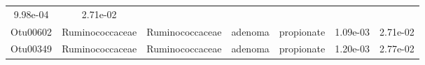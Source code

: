 \documentclass[11pt,]{article}
\begin{document}
\begin{longtable}[]{@{}ccccccc@{}}
\begin{minipage}[t]{0.09\columnwidth}
9.98e-04\strut
\end{minipage} & \begin{minipage}[t]{0.09\columnwidth}\centering\strut
2.71e-02\strut
\end{minipage}\tabularnewline
\begin{minipage}[t]{0.09\columnwidth}\centering\strut
Otu00602\strut
\end{minipage} & \begin{minipage}[t]{0.17\columnwidth}\centering\strut
Ruminococcaceae\strut
\end{minipage} & \begin{minipage}[t]{0.17\columnwidth}\centering\strut
Ruminococcaceae\strut
\end{minipage} & \begin{minipage}[t]{0.09\columnwidth}\centering\strut
adenoma\strut
\end{minipage} & \begin{minipage}[t]{0.11\columnwidth}\centering\strut
propionate\strut
\end{minipage} & \begin{minipage}[t]{0.09\columnwidth}\centering\strut
1.09e-03\strut
\end{minipage} & \begin{minipage}[t]{0.09\columnwidth}\centering\strut
2.71e-02\strut
\end{minipage}\tabularnewline
\begin{minipage}[t]{0.09\columnwidth}\centering\strut
Otu00349\strut
\end{minipage} & \begin{minipage}[t]{0.17\columnwidth}\centering\strut
Ruminococcaceae\strut
\end{minipage} & \begin{minipage}[t]{0.17\columnwidth}\centering\strut
Ruminococcaceae\strut
\end{minipage} & \begin{minipage}[t]{0.09\columnwidth}\centering\strut
adenoma\strut
\end{minipage} & \begin{minipage}[t]{0.11\columnwidth}\centering\strut
propionate\strut
\end{minipage} & \begin{minipage}[t]{0.09\columnwidth}\centering\strut
1.20e-03\strut
\end{minipage} & \begin{minipage}[t]{0.09\columnwidth}\centering\strut
2.77e-02\strut
\end{minipage}\tabularnewline

\end{longtable}
\end{document}
